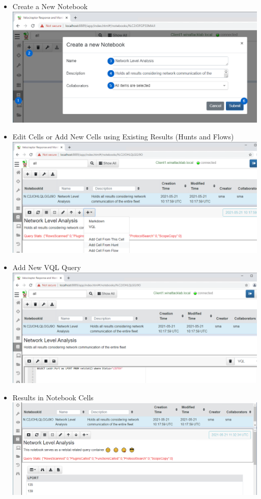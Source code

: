 \begin{itemize}
  \item Create a New Notebook \\ \includegraphics[width=\textwidth]{resources/06-velociraptor-notebooks-1.png}
  \item Edit Cells or Add New Cells using Existing Results (Hunts and Flows) \\ \includegraphics[width=\textwidth]{resources/06-velociraptor-notebooks-2.png}
  \item Add New VQL Query \\ \includegraphics[width=\textwidth]{resources/06-velociraptor-notebooks-3.png}
  \item Results in Notebook Cells \\ \includegraphics[width=\textwidth]{resources/06-velociraptor-notebooks-4.png}

\end{itemize}
